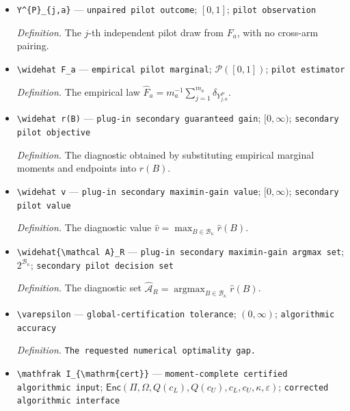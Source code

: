 \documentclass{article}
\begin{document}
\begin{itemize}
  \par\smallskip\noindent\emph{Definition.} The number of independent unpaired pilot outcomes observed under exposure label \(a\).
  \item \texttt{Y\textasciicircum{}\{P\}\allowbreak{}\_\allowbreak{}\{j,\allowbreak{}a\}\allowbreak{}} --- \texttt{unpaired pilot outcome}; \([0,1]\); \texttt{pilot observation}
  \par\smallskip\noindent\emph{Definition.} The \(j\)-th independent pilot draw from \(F_a\), with no cross-arm pairing.
  \item \texttt{\textbackslash{}\allowbreak{}widehat F\_\allowbreak{}a} --- \texttt{empirical pilot marginal}; \(\mathcal P([0,1])\); \texttt{pilot estimator}
  \par\smallskip\noindent\emph{Definition.} The empirical law \(\widehat F_a=m_a^{-1}\sum_{j=1}^{m_a}\delta_{Y^P_{j,a}}\).
  \item \texttt{\textbackslash{}\allowbreak{}widehat r(B)} --- \texttt{plug-\allowbreak{}in secondary guaranteed gain}; \([0,\infty)\); \texttt{secondary pilot objective}
  \par\smallskip\noindent\emph{Definition.} The diagnostic obtained by substituting empirical marginal moments and endpoints into \(r(B)\).
  \item \texttt{\textbackslash{}\allowbreak{}widehat v} --- \texttt{plug-\allowbreak{}in secondary maximin-\allowbreak{}gain value}; \([0,\infty)\); \texttt{secondary pilot value}
  \par\smallskip\noindent\emph{Definition.} The diagnostic value \(\widehat v=\max_{B\in\mathcal B_\kappa}\widehat r(B)\).
  \item \texttt{\textbackslash{}\allowbreak{}widehat\{\textbackslash{}\allowbreak{}mathcal A\}\allowbreak{}\_\allowbreak{}R} --- \texttt{plug-\allowbreak{}in secondary maximin-\allowbreak{}gain argmax set}; \(2^{\mathcal B_\kappa}\); \texttt{secondary pilot decision set}
  \par\smallskip\noindent\emph{Definition.} The diagnostic set \(\widehat{\mathcal A}_R=\operatorname*{argmax}_{B\in\mathcal B_\kappa}\widehat r(B)\).
  \item \texttt{\textbackslash{}\allowbreak{}varepsilon} --- \texttt{global-\allowbreak{}certification tolerance}; \((0,\infty)\); \texttt{algorithmic accuracy}
  \par\smallskip\noindent\emph{Definition.} \texttt{The requested numerical optimality gap.}
  \item \texttt{\textbackslash{}\allowbreak{}mathfrak I\_\allowbreak{}\{\textbackslash{}\allowbreak{}mathrm\{cert\}\allowbreak{}\}\allowbreak{}} --- \texttt{moment-\allowbreak{}complete certified algorithmic input}; \(\mathsf{Enc}(\Pi,\Omega,Q(c_L),Q(c_U),c_L,c_U,\kappa,\varepsilon)\); \texttt{corrected algorithmic interface}

\end{itemize}
\end{document}
